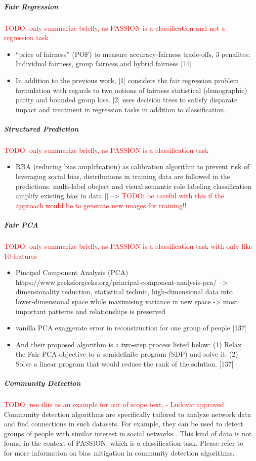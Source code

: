 \documentclass[12pt, a4paper, oneside]{book}   	%
\renewcommand{\todo}[1]{\textcolor{red}{TODO: #1}}
\begin{document}
			\subparagraph{Fair Regression}
				\todo{only summarize briefly, as PASSION is a classification and not a regression task}
				\begin{itemize}
					\item “price of fairness” (POF) to measure accuracy-fairness trade-offs, 3 penalites: Individual fairness, group fairness and hybrid fairness [14] \autocite{Mehrabi_2021}
					\item In addition to the previous work, [1] considers the fair regression problem formulation with regards to two notions of fairness statistical (demographic) parity and bounded group loss. [2] uses decision trees to satisfy disparate impact and treatment in regression tasks in addition to classification. \autocite{Mehrabi_2021}
				\end{itemize}
			\subparagraph{Structured Prediction}
				\todo{only summarize briefly, as PASSION is a classification task}
				\begin{itemize}
					\item RBA (reducing bias amplification) as calibration algorithm to prevent risk of leveraging social bias, distributions in training data are followed in the predictions. multi-label obeject and visual semantic role labeling classification amplify existing bias in data [\autocite{M167_Zhao_2017}] \autocite{Mehrabi_2021} --> \todo{be careful with this if the approach would be to generate new images for training!!}
				\end{itemize}
			\subparagraph{Fair PCA}
				\todo{only summarize briefly, as PASSION is a classification task with only like 10 features}
				\begin{itemize}
					\item Pincipal Component Analysis (PCA) https://www.geeksforgeeks.org/principal-component-analysis-pca/ --> dimensionality reduction, statistical technic, high-dimensional data into lower-dimensional space while maximising variance in new space -> most important patterns and relationships is preserved
					\item vanilla PCA exaggerate error in reconstruction for one group of people [137] \autocite{Mehrabi_2021}
					\item And their proposed algorithm is a two-step process listed below: (1) Relax the Fair PCA objective to a semidefinite program (SDP) and solve it. (2) Solve a linear program that would reduce the rank of the solution. [137] \autocite{Mehrabi_2021}
				\end{itemize}
			\subparagraph{Community Detection}
				\todo{use this as an example for out of scope text, - Ludovic approved}
				Community detection algorithms are specifically tailored to analyze network data and find connections in such datasets. For example, they can be used to detect groups of people with similar interest in social networks \autocite{Jayawickrama_2021}. This kind of data is not found in the context of PASSION, which is a classification task. Please refer to \cite{Mehrabi_2021} for more information on bias mitigation in community detection algorithms.
				
\end{document}

